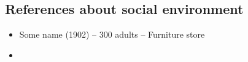 \documentclass{article}
\begin{document}
\subsection{References about social environment}

\begin{itemize}

    \item Some name (1902) -- 300 adults -- Furniture store




	\item 

\end{itemize}
\end{document}
